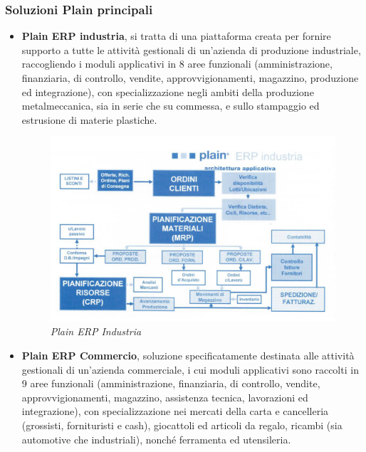 \subsubsection{Soluzioni Plain principali}
\begin{itemize}
	\item \textbf{Plain ERP industria}, si tratta di una piattaforma creata per fornire supporto a tutte le attività gestionali di un'azienda di produzione industriale, raccogliendo i moduli applicativi in 8 aree funzionali (amministrazione, finanziaria, di controllo, vendite, approvvigionamenti, magazzino, produzione ed integrazione), con specializzazione negli ambiti della produzione metalmeccanica, sia in serie che su commessa, e sullo stampaggio ed estrusione di materie plastiche.
	
	\begin{figure}[ht]
		\centering
		\includegraphics[scale=0.40]{immagini/azienda/plain_erp_industria}
		\caption{\textit{Plain ERP Industria}}
	\end{figure}\FloatBarrier
	
	\item \textbf{Plain ERP Commercio}, soluzione specificatamente destinata alle attività gestionali di un'azienda commerciale, i cui moduli applicativi sono raccolti in 9 aree funzionali (amministrazione, finanziaria, di controllo, vendite, approvvigionamenti, magazzino, assistenza tecnica, lavorazioni ed integrazione), con specializzazione nei mercati della carta e cancelleria (grossisti, fornituristi e cash), giocattoli ed articoli da regalo, ricambi (sia automotive che industriali), nonché ferramenta ed utensileria.
	

\end{itemize}
